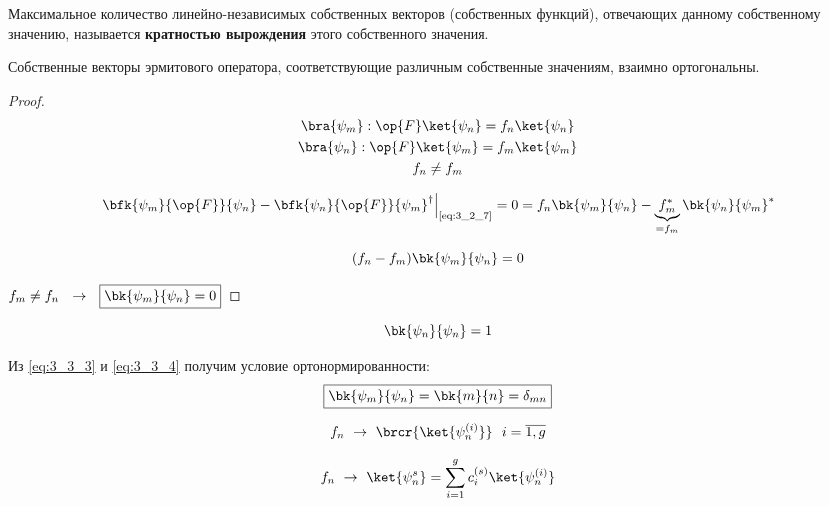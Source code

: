 \begin{defn}
Максимальное количество линейно-независимых собственных векторов (собственных функций), отвечающих данному собственному значению, называется \textbf{кратностью вырождения} этого собственного значения.
\end{defn}

\begin{stmt}
Собственные векторы эрмитового оператора, соответствующие различным собственные значениям, взаимно ортогональны.
\end{stmt}
\begin{proof}

\begin{equation}
\label{eq:3_3_2}
	\begin{gathered}
		\bra{\psi_m}: \op{F}\ket{\psi_n} = f_n \ket{\psi_n} \\
		\bra{\psi_n}: \op{F}\ket{\psi_m} = f_m \ket{\psi_m} \\
		f_n \neq f_m
	\end{gathered}
\end{equation}

$$
\left. \bfk{\psi_m}{\op{F}}{\psi_n} - \bfk{\psi_n}{\op{F}}{\psi_m}^\dag \right|_{\text{\eqref{eq:3_2_7}}} = 0 = f_n \bk{\psi_m}{\psi_n} - \underbrace{f_m^*}_{= f_m} \bk{\psi_n}{\psi_m}^*
$$

\begin{equation}
\label{eq:3_3_3}
(f_n - f_m) \bk{\psi_m}{\psi_n} = 0
\end{equation}

$f_m \neq f_n ~~\to~~ \boxed{\bk{\psi_m}{\psi_n} = 0}$

\end{proof}

\begin{equation}
\label{eq:3_3_4}
\bk{\psi_n}{\psi_n} = 1
\end{equation}

Из \eqref{eq:3_3_3} и \eqref{eq:3_3_4} получим условие ортонормированности:
\begin{equation}
\label{eq:3_3_5}
\boxed{
	\bk{\psi_m}{\psi_n} = \bk{m}{n} = \delta_{mn}
}
\end{equation}

$$
f_n ~\to~ \brcr{\ket{\psi_n^{(i)}}} ~~ i = \overline{1,g}
$$

\begin{equation}
\label{eq:3_3_6}
f_n ~\to~ \ket{\psi_n^s} = \sum_{i=1}^{g} c_i^{(s)} \ket{\psi_n^{(i)}}
\end{equation}

